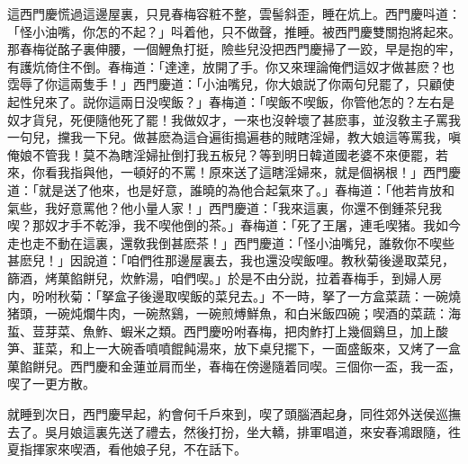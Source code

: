 這西門慶慌過這邊屋裏，只見春梅容粧不整，雲髻斜歪，睡在炕上。西門慶呌道：「怪小油嘴，你怎的不起？」呌着他，只不做聲，推睡。被西門慶雙關抱將起來。那春梅従酩子裏伸腰，一個鯉魚打挺，險些兒没把西門慶掃了一跤，早是抱的牢，有護炕倚住不倒。春梅道：「達達，放開了手。你又來理論俺們這奴才做甚麽？也霑辱了你這兩隻手！」西門慶道：「小油嘴兒，你大娘説了你兩句兒罷了，只顧使起性兒來了。説你這兩日没喫飯？」春梅道：「喫飯不喫飯，你管他怎的？左右是奴才貨兒，死便隨他死了罷！我做奴才，一來也沒幹壞了甚麽事，並沒敎主子罵我一句兒，攩我一下兒。做甚麽為這㒲遍街搗遍巷的賊瞎淫婦，教大娘這等罵我，嗔俺娘不管我！莫不為瞎淫婦扯倒打我五板兒？等到明日韓道國老婆不來便罷，若來，你看我指與他，一頓好的不罵！原來送了這瞎淫婦來，就是個祸根！」西門慶道：「就是送了他來，也是好意，誰曉的為他合起氣來了。」春梅道：「他若肯放和氣些，我好意罵他？他小量人家！」西門慶道：「我來這裏，你還不倒鍾茶兒我喫？那奴才手不乾淨，我不喫他倒的茶。」春梅道：「死了王屠，連毛喫猪。我如今走也走不動在這裏，還敎我倒甚麽茶！」西門慶道：「怪小油嘴兒，誰敎你不喫些甚麽兒！」因說道：「咱們徃那邊屋裏去，我也還没喫飯哩。教秋菊後邊取菜兒，篩酒，烤菓餡餅兒，炊鮓湯，咱們喫。」於是不由分説，拉着春梅手，到婦人房内，吩咐秋菊：「拏盒子後邊取喫飯的菜兒去。」不一時，拏了一方盒菜蔬：一碗燒猪頭，一碗炖爛牛肉，一碗熬鷄，一碗煎煿鮮魚，和白米飯四碗；喫酒的菜蔬：海蜇、荳芽菜、魚鮓、蝦米之類。西門慶吩咐春梅，把肉鮓打上幾個鷄旦，加上酸笋、韮菜，和上一大碗香噴噴餛飩湯來，放下桌兒擺下，一面盛飯來，又烤了一盒菓餡餅兒。西門慶和金蓮並肩而坐，春梅在傍邊隨着同喫。三個你一盃，我一盃，喫了一更方散。

就睡到次日，西門慶早起，約會何千戶來到，喫了頭腦酒起身，同徃郊外送侯巡撫去了。吳月娘這裏先送了禮去，然後打扮，坐大轎，排軍唱道，來安春鴻跟隨，徃夏指揮家來喫酒，看他娘子兒，不在話下。

